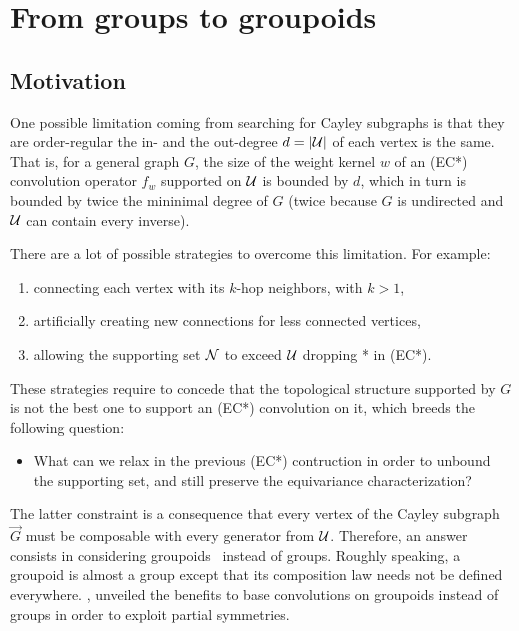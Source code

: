 \section{From groups to groupoids}

\subsection{Motivation}

One possible limitation coming from searching for Cayley subgraphs is that they are order-regular \ie the in- and the out-degree $d = |\mathcal{U}|$ of each vertex is the same. That is, for a general graph $G$, the size of the weight kernel $w$ of an (EC*) convolution operator $f_w$ supported on $\mathcal{U}$ is bounded by $d$, which in turn is bounded by twice the mininimal degree of $G$ (twice because $G$ is undirected and $\mathcal{U}$ can contain every inverse).

There are a lot of possible strategies to overcome this limitation. For example:
\begin{enumerate}
  \item connecting each vertex with its $k$-hop neighbors, with $k > 1$,
  \item artificially creating new connections for less connected vertices,
  \item allowing the supporting set $\mathcal{N}$ to exceed $\mathcal{U}$ \ie dropping * in (EC*).
\end{enumerate}

These strategies require to concede that the topological structure supported by $G$ is not the best one to support an (EC*) convolution on it, which breeds the following question:
\begin{itemize}
  \item What can we relax in the previous (EC*) contruction in order to unbound the supporting set, and still preserve the equivariance characterization?
\end{itemize}

The latter constraint is a consequence that every vertex of the Cayley subgraph $\vec{G}$ must be composable with every generator from $\mathcal{U}$. Therefore, an answer consists in considering groupoids~\citep{brandt1927verallgemeinerung} instead of groups. Roughly speaking, a groupoid is almost a group except that its composition law needs not be defined everywhere. \cite{weinstein1996groupoids}, unveiled the benefits to base convolutions on groupoids instead of groups in order to exploit partial symmetries.

